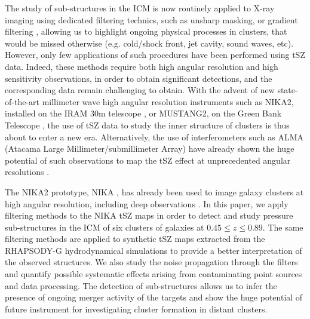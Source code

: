 \documentclass[twocolumn,traditabstract]{aa}
\begin{document}
The study of sub-structures in the ICM is now routinely applied to X-ray imaging using dedicated filtering technics, such as unsharp masking, or gradient filtering \citep[see, for example, recent results by][]{Sanders2016}, allowing us to highlight ongoing physical processes in clusters, that would be missed otherwise (e.g. cold/shock front, jet cavity, sound waves, etc). However, only few applications of such procedures have been performed using tSZ data. Indeed, these methods require both high angular resolution and high sensitivity observations, in order to obtain significant detections, and the corresponding data remain challenging to obtain. With the advent of new state-of-the-art millimeter wave high angular resolution instruments such as NIKA2, installed on the IRAM 30m telescope \citep[The New IRAM KIDs Array 2, $< 20$ arcsec resolution at 150 and 260 GHz,][]{Calvo2016,Catalano2016}, or MUSTANG2, on the Green Bank Telescope \citep[The MUltiplexed Squid Tes Array at Ninety Gigahertzh 2, $\sim 8$ arcsec at 90 GHz,][]{Dicker2014}, the use of tSZ data to study the inner structure of clusters is thus about to enter a new era. Alternatively, the use of interferometers such as ALMA (Atacama Large Millimeter/submillimeter Array) have already shown the huge potential of such observations to map the tSZ effect at unprecedented angular resolutions \citep{Kitayama2016}.

The NIKA2 prototype, NIKA \citep{Monfardini2011,Catalano2014}, has already been used to image galaxy clusters at high angular resolution, including deep observations \citep{Adam2014,Adam2015,Adam2016a,Adam2016b,Ruppin2016}. In this paper, we apply filtering methods to the NIKA tSZ maps in order to detect and study pressure sub-structures in the ICM of six clusters of galaxies at $0.45 \leq z \leq 0.89$. The same filtering methods are applied to synthetic tSZ maps extracted from the RHAPSODY-G hydrodynamical simulations \citep{Wu2013,Hahn2017} to provide a better interpretation of the observed structures. We also study the noise propagation through the filters and quantify possible systematic effects arising from contaminating point sources and data processing. The detection of sub-structures allows us to infer the presence of ongoing merger activity of the targets and show the huge potential of future instrument for investigating cluster formation in distant clusters.
\end{document}

